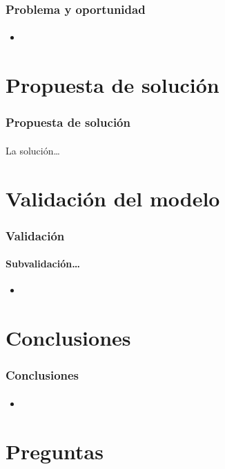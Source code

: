 \documentclass{beamer}
\begin{document}
\begin{frame}[<+->]
    \transdissolve
    \frametitle{Problema y oportunidad}
    \framesubtitle{}
    \begin{itemize}
      \item 
    \end{itemize}
\end{frame}



\section{Propuesta de solución}

\begin{frame}[<+->]
    \transdissolve
    \frametitle{Propuesta de solución}
    \framesubtitle{}
    \begin{block}{La solución\ldots}
    \end{block}
\end{frame}




\section{Validación del modelo}

\begin{frame}[<+->]
    \transdissolve
    \frametitle{Validación}
    \framesubtitle{Subvalidación\ldots}
    \begin{itemize}
      \item 
    \end{itemize}
\end{frame}


\section{Conclusiones}

\begin{frame}[<+->]
    \transdissolve
    \frametitle{Conclusiones}
    \framesubtitle{}
    \begin{itemize}
      \item 
    \end{itemize}
\end{frame}

\section{Preguntas}
\end{document}
